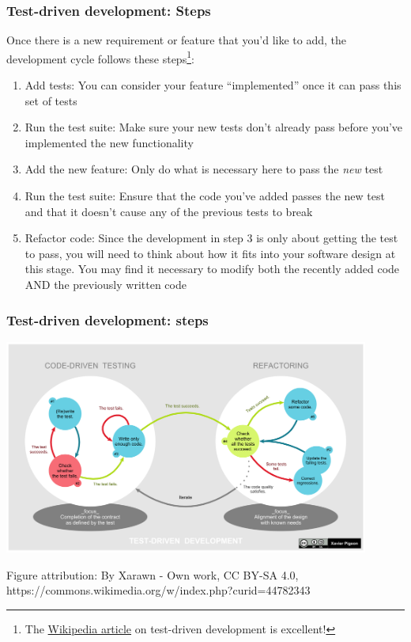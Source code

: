 \documentclass[10pt]{beamer}
\begin{document}
  \begin{frame} \frametitle{Test-driven development: Steps}

    {\small
    Once there is a new requirement or feature that you'd like to add, the development
    cycle follows these steps\footnote{The
    \href{https://en.wikipedia.org/wiki/Test-driven_development}{Wikipedia article} on
    test-driven development is excellent!}:

    \begin{enumerate}
      \item Add tests: You can consider your feature ``implemented'' once it can pass
        this set of tests
      \item Run the test suite: Make sure your new tests don't already pass before you've
        implemented the new functionality
      \item Add the new feature: Only do what is necessary here to pass the \textit{new}
        test
      \item Run the test suite: Ensure that the code you've added passes the new test and
        that it doesn't cause any of the previous tests to break
      \item Refactor code: Since the development in step 3 is only about getting the test
        to pass, you will need to think about how it fits into your software design at
        this stage. You may find it necessary to modify both the recently added code AND
        the previously written code
    \end{enumerate}
    }

  \end{frame}

  \begin{frame} \frametitle{Test-driven development: steps}

    \includegraphics[width=0.9\textwidth]{TDD_Global_Lifecycle}

    \tiny{Figure attribution: By Xarawn - Own work, CC BY-SA 4.0, https://commons.wikimedia.org/w/index.php?curid=44782343}

  \end{frame}
\end{document}
